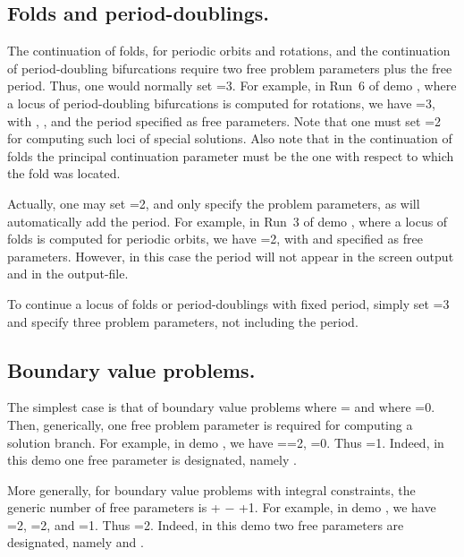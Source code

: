 \subsection{ Folds and period-doublings.}
The continuation of folds, for periodic orbits and rotations,
and the continuation of period-doubling bifurcations require two free 
problem parameters plus the free period. Thus, one would normally set =3.
For example, in Run~6 of demo , where a locus of period-doubling
bifurcations is computed for rotations, we have =3, 
with , , and the period specified as free parameters. 
Note that one must set =2 for computing such loci of special solutions.
Also note that in the continuation of folds the principal continuation parameter
must be the one with respect to which the fold was located.

Actually, one may set =2, and only specify the problem parameters,
as \AUTO will automatically add the period.
For example, in Run~3 of demo , where a locus of folds is computed 
for periodic orbits, we have =2, with  and  specified
as free parameters. 
However, in this case the period will not appear in the screen output 
and in the  output-file. 

To continue a locus of folds or period-doublings with fixed period, simply
set =3 and specify three problem parameters, not including
the period.

\subsection{ Boundary value problems.}
The simplest case is that of boundary value problems where 
= 
and where =0.
Then, generically, one free problem parameter is required for computing 
a solution branch.
For example, in demo , we have ==2, =0. 
Thus =1.
Indeed, in this demo one free parameter is designated,
namely .

More generally, for boundary value problems with integral constraints,
the generic number of free parameters is  + $-$ +1.
For example, in demo , we have =2, =2, and =1.
Thus =2. 
Indeed, in this demo two free parameters are designated,
namely  and .

